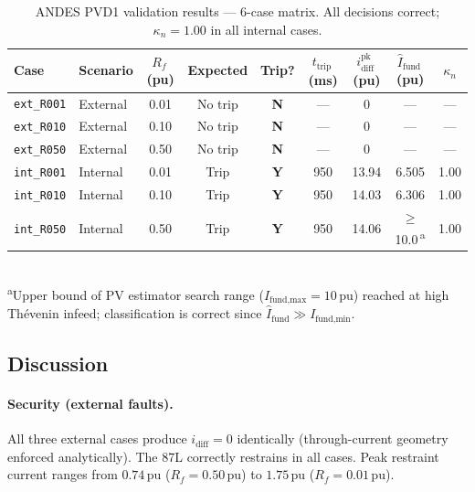 \documentclass[11pt, a4paper]{article}
\newcommand{\kn}{\kappa_n}
\begin{document}
\begin{table}[!t]
  \centering
  \caption{ANDES PVD1 validation results — 6-case matrix.
           All decisions correct; $\kn = 1.00$ in all internal cases.}
  \label{tab:andes_results}
  \begin{tabular}{llccccccc}
    \toprule
    Case & Scenario & $R_f$\,(pu) & Expected & Trip?
         & $t_\text{trip}$\,(ms) & $i_\text{diff}^\text{pk}$\,(pu)
         & $\hat{I}_\text{fund}$\,(pu) & $\kn$ \\
    \midrule
    \texttt{ext\_R001} & External & 0.01 & No trip & \textbf{N}
         & --- & 0    & ---   & --- \\
    \texttt{ext\_R010} & External & 0.10 & No trip & \textbf{N}
         & --- & 0    & ---   & --- \\
    \texttt{ext\_R050} & External & 0.50 & No trip & \textbf{N}
         & --- & 0    & ---   & --- \\
    \texttt{int\_R001} & Internal & 0.01 & Trip & \textbf{Y}
         & 950 & 13.94 & 6.505 & 1.00 \\
    \texttt{int\_R010} & Internal & 0.10 & Trip & \textbf{Y}
         & 950 & 14.03 & 6.306 & 1.00 \\
    \texttt{int\_R050} & Internal & 0.50 & Trip & \textbf{Y}
         & 950 & 14.06 & $\geq$10.0\,\textsuperscript{a} & 1.00 \\
    \bottomrule
  \end{tabular}
  \\[4pt]
  \footnotesize\textsuperscript{a}Upper bound of PV estimator search range
  ($I_\text{fund,max}=10\,\text{pu}$) reached at high Th\'evenin infeed;
  classification is correct since $\hat{I}_\text{fund} \gg I_\text{fund,min}$.
\end{table}

\subsection{Discussion}

\paragraph{Security (external faults).}
All three external cases produce $i_\text{diff} = 0$ identically (through-current
geometry enforced analytically).  The 87L correctly restrains in all cases.  Peak
restraint current ranges from $0.74\,\text{pu}$ ($R_f = 0.50\,\text{pu}$) to
$1.75\,\text{pu}$ ($R_f = 0.01\,\text{pu}$).
\end{document}
